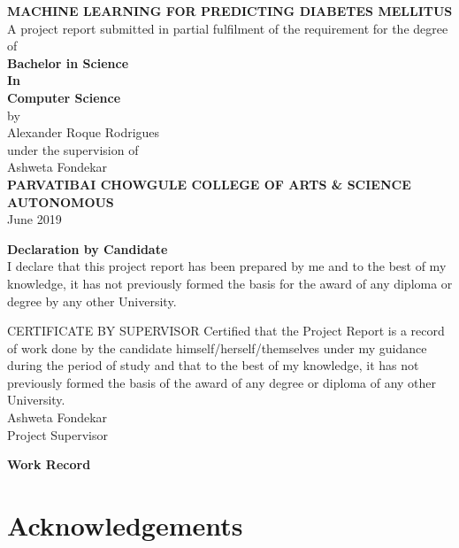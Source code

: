 \documentclass[12pt]{article}
\begin{document}
\begin{titlepage}
\newcommand{\HRule}{\rule{\linewidth}{0.5mm}} 
\center
\doublespacing
\textbf{\Huge MACHINE LEARNING FOR PREDICTING DIABETES MELLITUS}
\\
\singlespacing
\Large
\vspace{3cm}
A project report submitted in partial fulfilment of the requirement for the degree of\\
\vspace{1cm}
\textbf{Bachelor in Science\\In\\Computer Science}
\\by\\
\Large
Alexander Roque Rodrigues
\\
\vspace{1cm}
under the supervision of
\vspace{1cm}
\\
Ashweta Fondekar
\\
\textbf{PARVATIBAI CHOWGULE COLLEGE OF ARTS \& SCIENCE AUTONOMOUS}
\\June 2019
\end{titlepage}

\newpage
\vspace{5cm}
\begin{center}

\textbf{Declaration by Candidate}\\

I declare that this project report has been prepared by me and to the best of my
knowledge, it has not previously formed the basis for the award of any diploma or degree by
any other University.



\end{center}
\newpage

CERTIFICATE BY SUPERVISOR
Certified that the Project Report is a record of work done by the candidate himself/herself/themselves under my guidance during the period of study and that to the best of my knowledge, it has not previously formed the basis of the award of any degree or diploma of any other University.\\

Ashweta Fondekar\\

Project Supervisor
\newpage

\textbf{Work Record}

\newpage
\section{Acknowledgements}
\end{document}
